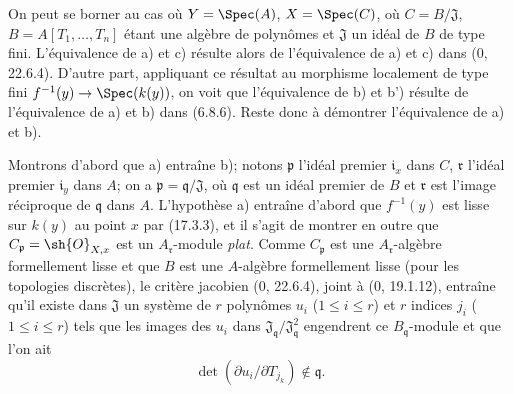 On peut se borner au cas où $Y=\Spec(A)$, $X=\Spec(C)$, où $C=B/\mathfrak{J}$, $B=A[T_1,\ldots,T_n]$ étant une algèbre de polynômes et $\mathfrak{J}$ un idéal de $B$ de type fini. L'équivalence de a) et c) résulte alors de l'équivalence de a) et c) dans (0, 22.6.4). D'autre part, appliquant ce résultat au morphisme localement de type fini $f^{-1}(y)\to\Spec(k(y))$, on voit que l'équivalence de b) et b') résulte de l'équivalence de a) et b) dans (6.8.6). Reste donc à démontrer l'équivalence de a) et b).

Montrons d'abord que a) entraîne b); notons $\mathfrak p$ l'idéal premier $\mathfrak i_x$ dans $C$, $\mathfrak r$ l'idéal premier $\mathfrak i_y$ dans $A$; on a $\mathfrak p=\mathfrak q/\mathfrak J$, où $\mathfrak q$ est un idéal premier de $B$ et $\mathfrak r$ est l'image réciproque de $\mathfrak q$ dans $A$. L'hypothèse a) entraîne d'abord que $f^{-1}(y)$ est lisse sur $k(y)$ au point $x$ par (17.3.3), et il s'agit de montrer en outre que $C_{\mathfrak p}=\sh{O}_{X,x}$ est un $A_{\mathfrak r}$-module \emph{plat}. Comme $C_{\mathfrak p}$ est une $A_{\mathfrak r}$-algèbre formellement lisse et que $B$ est une $A$-algèbre formellement lisse (pour les topologies discrètes), le critère jacobien (0, 22.6.4), joint à (0, 19.1.12), entraîne qu'il existe dans $\mathfrak J$ un système de $r$ polynômes $u_i$ ($1\leq i\leq r$) et $r$ indices $j_i$ ($1\leq i\leq r$) tels que les images des $u_i$ dans $\mathfrak J_{\mathfrak q}/\mathfrak J_{\mathfrak q}^2$ engendrent ce $B_{\mathfrak q}$-module et que l'on ait
\[
\label{IV.17.5.1.1}
\det(\partial u_i/\partial T_{j_k})\notin\mathfrak q.
\tag{17.5.1.1}
\]

